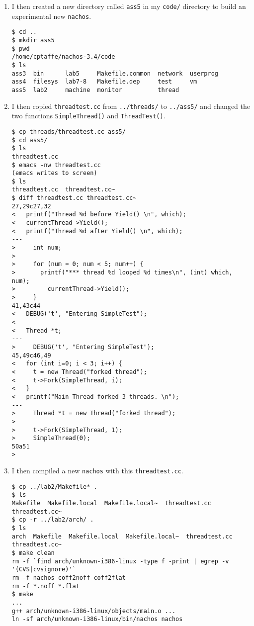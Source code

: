 \documentclass[letterpaper, 10pt]{article}
\begin{document}
	\begin{enumerate}

		\item{
		I then created a new directory called {\tt ass5} in my {\tt code/} directory to build an experimental new {\tt nachos}.

		\begin{verbatim}
$ cd ..
$ mkdir ass5
$ pwd
/home/cptaffe/nachos-3.4/code
$ ls
ass3  bin      lab5     Makefile.common  network  userprog
ass4  filesys  lab7-8   Makefile.dep     test     vm
ass5  lab2     machine  monitor          thread
		\end{verbatim}
		}

		\item{
		I then copied {\tt threadtest.cc} from {\tt ../threads/} to {\tt ../ass5/} and changed the two functions {\tt SimpleThread()} and {\tt ThreadTest()}.
		\begin{verbatim}
$ cp threads/threadtest.cc ass5/
$ cd ass5/
$ ls
threadtest.cc
$ emacs -nw threadtest.cc
(emacs writes to screen)
$ ls
threadtest.cc  threadtest.cc~
$ diff threadtest.cc threadtest.cc~
27,29c27,32
<   printf("Thread %d before Yield() \n", which);
<   currentThread->Yield();
<   printf("Thread %d after Yield() \n", which);
---
>     int num;
>
>     for (num = 0; num < 5; num++) {
>       printf("*** thread %d looped %d times\n", (int) which, num);
>         currentThread->Yield();
>     }
41,43c44
<   DEBUG('t', "Entering SimpleTest");
<
<   Thread *t;
---
>     DEBUG('t', "Entering SimpleTest");
45,49c46,49
<   for (int i=0; i < 3; i++) {
<     t = new Thread("forked thread");
<     t->Fork(SimpleThread, i);
<   }
<   printf("Main Thread forked 3 threads. \n");
---
>     Thread *t = new Thread("forked thread");
>
>     t->Fork(SimpleThread, 1);
>     SimpleThread(0);
50a51
>
		\end{verbatim}
		}

		\item{
		I then compiled a new {\tt nachos} with this {\tt threadtest.cc}.

		\begin{verbatim}
$ cp ../lab2/Makefile* .
$ ls
Makefile  Makefile.local  Makefile.local~  threadtest.cc  threadtest.cc~
$ cp -r ../lab2/arch/ .
$ ls
arch  Makefile  Makefile.local  Makefile.local~  threadtest.cc  threadtest.cc~
$ make clean
rm -f `find arch/unknown-i386-linux -type f -print | egrep -v '(CVS|cvsignore)'`
rm -f nachos coff2noff coff2flat
rm -f *.noff *.flat
$ make
...
g++ arch/unknown-i386-linux/objects/main.o ...
ln -sf arch/unknown-i386-linux/bin/nachos nachos
		\end{verbatim}
		}


\end{enumerate}
\end{document}
